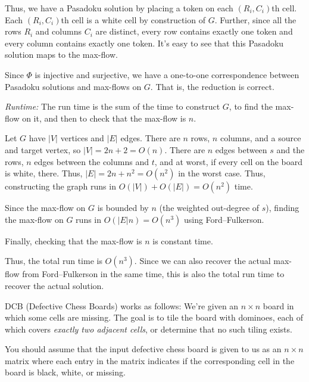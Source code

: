 \documentclass[12 pt, letterpaper]{hmcpset}
\begin{document}
\begin{solution}
	Thus, we have a Pasadoku solution by placing a token on each $(R_{i}, C_{i})$th cell. Each $(R_{i}, C_{i})$th cell is a white cell by construction of $G$. Further, since all the rows $R_{i}$ and columns $C_{i}$ are distinct, every row contains exactly one token and every column contains exactly one token. It's easy to see that this Pasadoku solution maps to the max-flow.

	Since $\Phi$ is injective and surjective, we have a one-to-one correspondence between Pasadoku solutions and max-flows on $G$. That is, the reduction is correct.

	\emph{Runtime:} The run time is the sum of the time to construct $G$, to find the max-flow on it, and then to check that the max-flow is $n$. 

	Let $G$ have $\lvert V \rvert$ vertices and $\lvert E \rvert$ edges. There are $n$ rows, $n$ columns, and a source and target vertex, so $\lvert V \rvert = 2n + 2 = O(n)$. There are $n$ edges between $s$ and the rows, $n$ edges between the columns and $t$, and at worst, if every cell on the board is white, there. Thus, $\lvert E \rvert = 2n + n^{2} = O(n^{2})$ in the worst case. Thus, constructing the graph runs in $O(\lvert V \rvert) + O(\lvert E \rvert) = O(n^{2})$ time.

	Since the max-flow on $G$ is bounded by $n$ (the weighted out-degree of $s$), finding the max-flow on $G$ runs in $O(\lvert E \rvert n) = O(n^{3})$ using Ford--Fulkerson.

	Finally, checking that the max-flow is $n$ is constant time.

	Thus, the total run time is $O(n^{3})$. Since we can also recover the actual max-flow from Ford--Fulkerson in the same time, this is also the total run time to recover the actual solution.
\end{solution}

\begin{problem}
	DCB (Defective Chess Boards) works as follows: We're given an $n \times n$ board in which some cells are missing.  The goal is to tile the board with dominoes, each of which covers \emph{exactly two adjacent cells}, or determine that no such tiling exists.

	You should assume that the input defective chess board is given to us as an $n \times n$ matrix where each entry in the matrix indicates if the corresponding cell in the board is black, white, or missing.
\end{problem}
\end{document}

